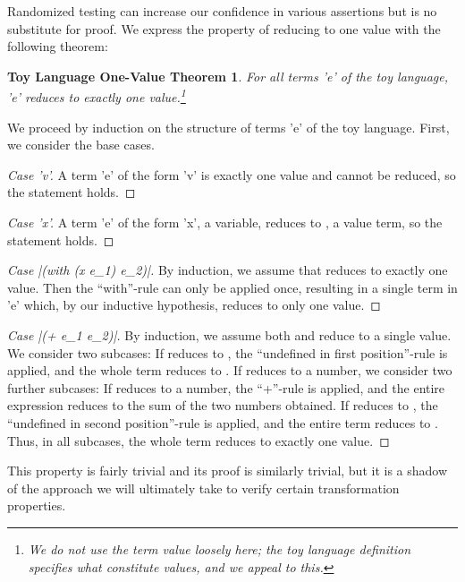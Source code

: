 \documentclass[ms,electronic,twosidetoc,letterpaper,chaptercenter,parttop]{byumsphd}
\begin{document}
Randomized testing can increase our confidence in various assertions but is no substitute 
for proof. We express the property of reducing to one value with the following theorem:

\newtheorem*{toythm}{Toy Language One-Value Theorem}
\begin{toythm}
For all terms \scheme'e' of the toy language, \scheme'e' reduces to exactly one
value.\footnote{We do not use the term \emph{value} loosely here; the toy language
definition specifies what constitute values, and we appeal to this.}
\end{toythm}
We proceed by induction on the structure of terms \scheme'e' of the toy language. First,
we consider the base cases.
\begin{proof}[Case \scheme'v']
A term \scheme'e' of the form \scheme'v' is exactly one value and cannot be reduced, 
so the statement holds.
\end{proof}
\begin{proof}[Case \scheme'x']
A term \scheme'e' of the form \scheme'x', a variable, reduces to , 
a value term, so the statement holds.
\end{proof}
\begin{proof}[Case \scheme|(with (x e_1) e_2)|]
By induction, we assume that  reduces to exactly one value. Then the
``with''-rule can only be applied once, resulting in a single term  in
\scheme'e' which, by our inductive hypothesis, reduces to only one value.
\end{proof}
\begin{proof}[Case \scheme|(+ e_1 e_2)|]
By induction, we assume both  and  reduce to a single value. We
consider two subcases: If  reduces to , the ``undefined in
first position''-rule is applied, and the whole term reduces to . If
 reduces to a number, we consider two further subcases: If 
reduces to a number, the ``+''-rule is applied, and the entire expression reduces to the
sum of the two numbers obtained. If  reduces to , the
``undefined in second position''-rule is applied, and the entire term reduces to
. Thus, in all subcases, the whole term reduces to exactly one value.
\end{proof}

This property is fairly trivial and its proof is similarly trivial, but it is a shadow of 
the approach we will ultimately take to verify certain transformation properties.
\end{document}
